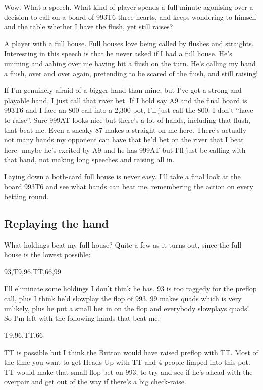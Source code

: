 Wow. What a speech. What kind of player spends a full minute agonising
over a decision to call on a board of 993T6 three hearts, and keeps
wondering to himself and the table whether I have the flush, yet still
raises?

A player with a full house. Full houses love being called by flushes
and straights. Interesting in this speech is that he never asked
if I had a full house. He's umming and aahing over me having
hit a flush on the turn. He's calling my hand a flush, over and over
again, pretending to be scared of the flush, and still raising!

If I'm genuinely afraid of a bigger hand than mine, but I've
got a strong and playable hand, I just call that river bet.
If I hold say A9 and the final board is 993T6 and I face an 800 call into
a 2,300 pot, I'll just call the 800. I don't ``have to raise''. Sure 999AT 
looks nice but there's a lot of hands, including that flush, that beat me. 
Even a sneaky 87 makes a straight on me here. There's actually not many 
hands my opponent can have that he'd bet on the river that I beat here- maybe 
he's excited by A9 and he has 999AT but I'll just be calling with that hand,
not making long speeches and raising all in.

Laying down a both-card full house is never easy. I'll take a final look
at the board 993T6 and see what hands can beat me, remembering the
action on every betting round.

\subsection{Replaying the hand}

What holdings beat my full house? Quite a few as it turns out, since
the full house is the lowest possible:

93,T9,96,TT,66,99

I'll eliminate some holdings I don't think he has. 93 is too raggedy
for the preflop call, plus I think he'd slowplay the flop of 993.
99 makes quads which is very unlikely, plus he put a small bet in
on the flop and everybody slowplays quads! So I'm left with the following
hands that beat me:

T9,96,TT,66

TT is possible but I think the Button would have raised preflop with TT.
Most of the time you want to get Heads Up with TT and 4 people limped
into this pot. TT would make that small flop bet on 993, to try and see
if he's ahead with the overpair and get out of the way if there's a big
check-raise.

